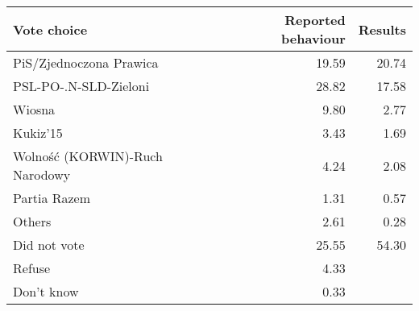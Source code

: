 
\begin{tabular}{l|rr}
\hline
Vote choice & Reported behaviour & Results\\
\hline
PiS/Zjednoczona Prawica & 19.59 & 20.74\\
PSL-PO-.N-SLD-Zieloni & 28.82 & 17.58\\
Wiosna & 9.80 & 2.77\\
Kukiz'15 & 3.43 & 1.69\\
Wolność (KORWIN)-Ruch Narodowy & 4.24 & 2.08\\
Partia Razem & 1.31 & 0.57\\
Others & 2.61 & 0.28\\
Did not vote & 25.55 & 54.30\\
Refuse & 4.33 & \\
Don't know & 0.33 & \\
\hline
\end{tabular}
